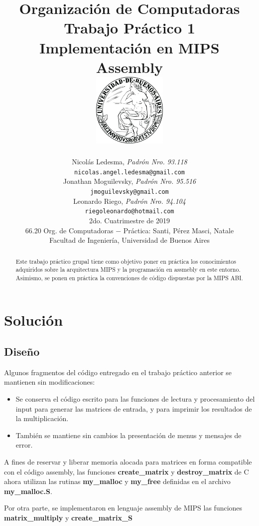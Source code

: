 \documentclass[a4paper,10pt, spanish]{article}
\title{
            \large{Organización de Computadoras} \\
            \textbf{Trabajo Práctico 1} \\
            \textbf{Implementación en MIPS Assembly} \\
            \bigskip
            \includegraphics[max height=100pt,max width=100pt]{./UBA.png} \\
}
\author{	Nicolás Ledesma, \textit{Padrón Nro. 93.118}                        \\
            \texttt{ nicolas.angel.ledesma@gmail.com }                           \\[2.5ex]
            Jonathan Moguilevsky, \textit{Padrón Nro. 95.516}                   \\
            \texttt{ jmoguilevsky@gmail.com }                                   \\[2.5ex]
            Leonardo Riego, \textit{Padrón Nro. 94.104}                 \\
            \texttt{ riegoleonardo@hotmail.com }                                          \\[2.5ex]
            \normalsize{2do. Cuatrimestre de 2019}                              \\
            \normalsize{66.20 Org. de Computadoras
                $-$ Práctica: Santi, Pérez Masci, Natale }                      \\
            \normalsize{Facultad de Ingeniería, Universidad de Buenos Aires}    \\
       }
\date{}
\begin{document}
\maketitle

\thispagestyle{empty}   %


\begin{abstract}
Este trabajo práctico grupal tiene como objetivo poner en práctica los conocimientos adquiridos sobre la arquitectura MIPS y la programación en assmebly en este entorno. Asimismo, se ponen en práctica la convenciones de código dispuestas por la MIPS ABI.
\end{abstract}

\pagebreak




\section{Solución}

\subsection{Diseño}
Algunos fragmentos del código entregado en el trabajo práctico anterior se mantienen sin modificaciones:
\begin{itemize}
  \item Se conserva el código escrito para las funciones de lectura y procesamiento del input para generar las matrices de entrada, y para imprimir los resultados de la multiplicación.
  \item También se mantiene sin cambios la presentación de menus y mensajes de error.
\end{itemize}

A fines de reservar y liberar memoria alocada para matrices en forma compatible con el código assembly, las funciones \textbf{create\_matrix} y \textbf{destroy\_matrix} de C ahora utilizan las rutinas \textbf{my\_malloc} y \textbf{my\_free} definidas en el archivo \textbf{my\_malloc.S}. 

Por otra parte, se implementaron en lenguaje assembly de MIPS las funciones \textbf{matrix\_multiply} y \textbf{create\_matrix\_S}
\end{document}
